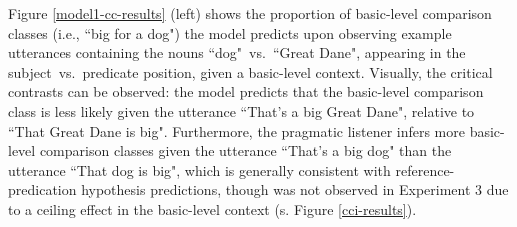 Figure \ref{model1-cc-results} (left) shows the proportion of basic-level comparison classes (i.e., ``big for a dog") the model predicts upon observing example utterances containing the nouns ``dog"~vs.~``Great Dane", appearing in the subject~vs.~predicate position, given a basic-level context. 
Visually, the critical contrasts can be observed: the model predicts that the basic-level comparison class is less likely given the utterance ``That's a big Great Dane", relative to ``That Great Dane is big". %
Furthermore, the pragmatic listener infers more basic-level comparison classes given the utterance ``That's a big dog" than the utterance ``That dog is big", which is generally consistent with reference-predication hypothesis predictions, though was not observed in Experiment 3 due to a ceiling effect in the basic-level context (s. Figure \ref{cci-results}). 

